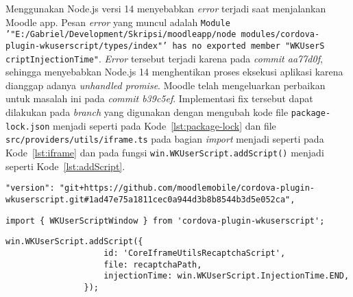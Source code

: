Menggunakan Node.js versi 14 menyebabkan \textit{error} terjadi saat menjalankan Moodle app. Pesan \textit{error} yang muncul adalah \texttt{Module '"E:/Gabriel/Development/Skripsi/moodleapp/node \textunderscore modules/cordova-plugin-wkuserscript/types/index"' has no exported member "WKUserS \\ criptInjectionTime"}. \textit{Error} tersebut terjadi karena pada \textit{commit aa77d0f}\cite{moodleapp:git:wkuserscript}, sehingga menyebabkan Node.js 14 menghentikan proses eksekusi aplikasi karena dianggap adanya \textit{unhandled promise}. Moodle telah mengeluarkan perbaikan untuk masalah ini pada \textit{commit b39c5ef}\cite{moodleapp:git:wkuserscriptfix}. Implementasi fix tersebut dapat dilakukan pada \textit{branch} yang digunakan dengan mengubah kode file \texttt{package-lock.json} menjadi seperti pada \mbox{Kode \ref{lst:package-lock}} dan file \texttt{src/providers/utils/iframe.ts} pada bagian \textit{import} menjadi seperti pada \mbox{Kode \ref{lst:iframe}} dan pada fungsi \texttt{win.WKUserScript.addScript()} menjadi seperti \mbox{Kode \ref{lst:addScript}}.

\begin{lstlisting}[frame=single, label ={lst:package-lock}, caption = Perbaikan pada \texttt{package-lock.json} ]
	"version": "git+https://github.com/moodlemobile/cordova-plugin-wkuserscript.git#1ad47e75a1811cec0a944d3b8b8544b3d5e052ca",
\end{lstlisting}
 
\begin{lstlisting}[frame=single, label={lst:iframe}, caption = Perbaikan pada bagian \textit{import} file \texttt{iframe.ts}]
	import { WKUserScriptWindow } from 'cordova-plugin-wkuserscript';
\end{lstlisting}

\begin{lstlisting}[frame=single, label={lst:addScript}, caption = Perbaikan pada bagian fungsi \texttt{win.WKUserScript.addScript()} file \texttt{iframe.ts}]
	        	win.WKUserScript.addScript({
                    id: 'CoreIframeUtilsRecaptchaScript',
                    file: recaptchaPath,
                    injectionTime: win.WKUserScript.InjectionTime.END,
                });
\end{lstlisting}